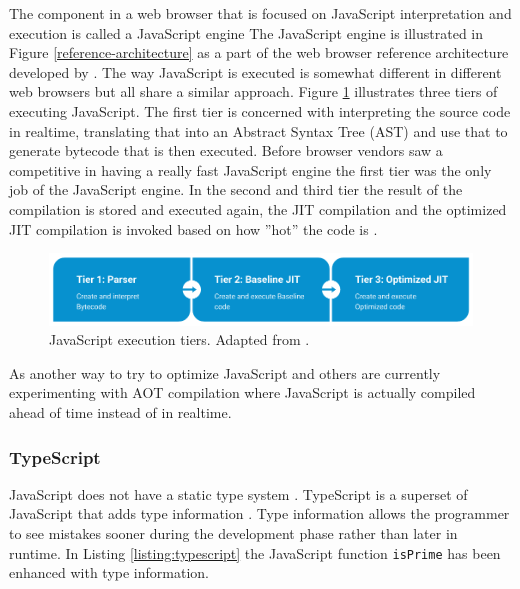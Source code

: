 The component in a web browser that is focused on JavaScript interpretation and execution is called a JavaScript engine \parencite{JeonChoi2012} The JavaScript engine is illustrated in Figure \ref{reference-architecture} as a part of the web browser reference architecture developed by \textcite{GrosskurthGodfrey2005}. The way JavaScript is executed is somewhat different in different web browsers but all share a similar approach. Figure \ref{javascript-optimization} illustrates three tiers of executing JavaScript. The first tier is concerned with interpreting the source code in realtime, translating that into an Abstract Syntax Tree (AST) and use that to generate bytecode that is then executed. Before browser vendors saw a competitive in having a really fast JavaScript engine the first tier was the only job of the JavaScript engine. In the second and third tier the result of the compilation is stored and executed again, the JIT compilation and the optimized JIT compilation is invoked based on how ''hot'' the code is \parencite{KedlayaRobatmiliHardekopf2015,ParkKimParkMoon2018}.

\begin{figure}[!h]
\centering
\includegraphics[width=16cm,keepaspectratio]{figures/javascript-optimization}
\caption{JavaScript execution tiers. Adapted from \textcite{ParkKimMoon2017,ZhuykovVardanyanMelnikBuchatskiySharygin2015}.}
\label{javascript-optimization}
\end{figure}        

As another way to try to optimize JavaScript \textcite{ParkJungMoon2015,ZhuykovVardanyanMelnikBuchatskiySharygin2015} and others are currently experimenting with AOT compilation where JavaScript is actually compiled ahead of time instead of in realtime.

\subsubsection{TypeScript}

JavaScript does not have a static type system \parencite{Park2014}. TypeScript is a superset of JavaScript that adds type information \parencite{DeWolffHage2017}. Type information allows the programmer to see mistakes sooner during the development phase rather than later in runtime. In Listing \ref{listing:typescript} the JavaScript function \texttt{isPrime} has been enhanced with type information.

